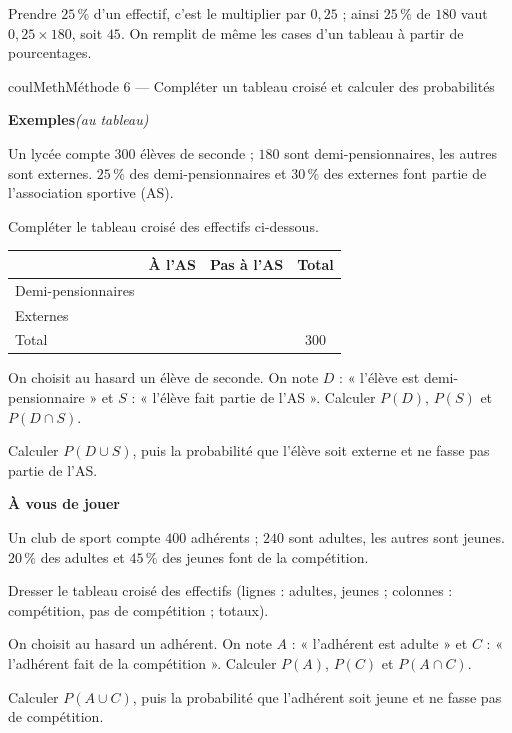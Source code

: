 \documentclass[11pt,a4paper]{article}
\makeatletter
\newcounter{lycee@signet}
\newcommand{\signet}[3][]{\stepcounter{lycee@signet}%
  \edef\lycee@dest{\if\relax\detokenize{#1}\relax
    signet.\arabic{lycee@signet}\else#1\fi}%
  \hypertarget{\lycee@dest}{}\bookmark[level=#2,dest=\lycee@dest]{#3}}
\newcounter{methode}
\newenvironment{methodebox}[1][Méthode]{\stepcounter{methode}%
  \begin{boitecours}[phantom={\signet[methode-\arabic{methode}]{2}{#1}}]{coulMeth}{#1}}%
  {\end{boitecours}}
\newcommand{\etape}[1]{\par\smallskip\textbf{\color{coulMeth}#1}\par\nobreak\smallskip}
\newcommand{\autableau}{\hfill{\footnotesize\itshape\color{black!45}(au tableau)}}
\newcommand{\etapeexemples}{%
    \par\smallskip\textbf{\color{coulMeth}Exemples}\autableau\par\nobreak\smallskip}
\makeatother
\begin{document}
\begin{remarquebox}
Prendre $25\,\%$ d'un effectif, c'est le multiplier par $0{,}25$ ; ainsi $25\,\%$ de $180$
vaut $0{,}25\times 180$, soit $45$. On remplit de même les cases d'un tableau
à partir de pourcentages.
\end{remarquebox}

\begin{methodebox}[Méthode 6 --- Compléter un tableau croisé et calculer des probabilités]
\etapeexemples
Un lycée compte $300$ élèves de seconde ; $180$ sont demi-pensionnaires, les autres
sont externes. $25\,\%$ des demi-pensionnaires et $30\,\%$ des externes font partie de
l'association sportive (AS).
\begin{questions}[label=\alph*)]
  \item Compléter le tableau croisé des effectifs ci-dessous.
    \begin{center}
    \renewcommand{\arraystretch}{1.5}
    \begin{tabular}{|l|c|c|c|}
    \hline
     & À l'AS & Pas à l'AS & Total \\
    \hline
    Demi-pensionnaires & & & \\
    \hline
    Externes & & & \\
    \hline
    Total & & & $300$ \\
    \hline
    \end{tabular}
    \end{center}
  \item On choisit au hasard un élève de seconde. On note $D$ : « l'élève est
    demi-pensionnaire » et $S$ : « l'élève fait partie de l'AS ». Calculer $P(D)$,
    $P(S)$ et $P(D\cap S)$.
  \item Calculer $P(D\cup S)$, puis la probabilité que l'élève soit externe et ne
    fasse pas partie de l'AS.
\end{questions}

\etape{À vous de jouer}
Un club de sport compte $400$ adhérents ; $240$ sont adultes, les autres sont jeunes.
$20\,\%$ des adultes et $45\,\%$ des jeunes font de la compétition.
\begin{questions}[label=\alph*)]
  \item Dresser le tableau croisé des effectifs (lignes : adultes, jeunes ; colonnes :
    compétition, pas de compétition ; totaux).
  \item On choisit au hasard un adhérent. On note $A$ : « l'adhérent est adulte » et
    $C$ : « l'adhérent fait de la compétition ». Calculer $P(A)$, $P(C)$ et
    $P(A\cap C)$.
  \item Calculer $P(A\cup C)$, puis la probabilité que l'adhérent soit jeune et ne
    fasse pas de compétition.
\end{questions}

\end{methodebox}
\end{document}
